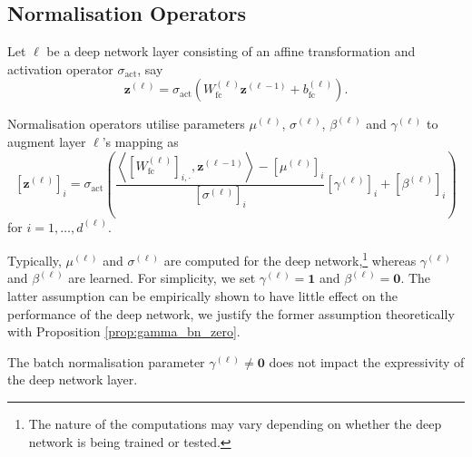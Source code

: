 \subsection{Normalisation Operators}

Let $\ell$ be a deep network layer consisting of an affine transformation and activation operator $\sigma_{\text{act}}$, say $$\mathbf{z}^{(\ell)}=\sigma_{\text{act}}\left(W_{\text{fc}}^{(\ell)}\mathbf{z}^{(\ell-1)}+b^{(\ell)}_{\text{fc}}\right).$$

Normalisation operators utilise parameters $\mu^{(\ell)}$, $\sigma^{(\ell)}$, $\beta^{(\ell)}$ and $\gamma^{(\ell)}$ to augment layer $\ell$'s mapping as $$\left[\mathbf{z}^{(\ell)}\right]_i=\sigma_{\text{act}}\left(\frac{\left\langle\left[W_{\text{fc}}^{(\ell)}\right]_{i,\cdot},\mathbf{z}^{(\ell-1)}\right\rangle-\left[\mu^{(\ell)}\right]_i}{\left[\sigma^{(\ell)}\right]_i}\left[\gamma^{(\ell)}\right]_i+\left[\beta^{(\ell)}\right]_i\right)$$for $i=1,\dots,d^{(\ell)}$.

Typically, $\mu^{(\ell)}$ and $\sigma^{(\ell)}$ are computed for the deep network,\footnote{The nature of the computations may vary depending on whether the deep network is being trained or tested.} whereas $\gamma^{(\ell)}$ and $\beta^{(\ell)}$ are learned. For simplicity, we set $\gamma^{(\ell)}=\mathbf{1}$ and $\beta^{(\ell)}=\mathbf{0}$. The latter assumption can be empirically shown to have little effect on the performance of the deep network, we justify the former assumption theoretically with Proposition \ref{prop:gamma_bn_zero}.

\begin{proposition}\label{prop:gamma_bn_zero}
    The batch normalisation parameter $\gamma^{(\ell)}\neq\mathbf{0}$ does not impact the expressivity of the deep network layer.
\end{proposition}

